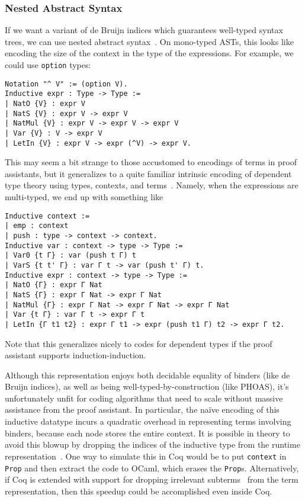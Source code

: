 \subsubsection{Nested Abstract Syntax} \label{sec:binders:nested-abstract-syntax}
If we want a variant of de Bruijn indices which guarantees well-typed syntax trees, we can use nested abstract syntax~\cite{Nested2012Hirschowitz,deBruijn1999Bird}.
On mono-typed ASTs, this looks like encoding the size of the context in the type of the expressions.
For example, we could use \texttt{option} types:~\cite{Nested2012Hirschowitz}
\begin{verbatim}
Notation "^ V" := (option V).
Inductive expr : Type -> Type :=
| NatO {V} : expr V
| NatS {V} : expr V -> expr V
| NatMul {V} : expr V -> expr V -> expr V
| Var {V} : V -> expr V
| LetIn {V} : expr V -> expr (^V) -> expr V.
\end{verbatim}

This may seem a bit strange to those accustomed to encodings of terms in proof assistants, but it generalizes to a quite familiar intrinsic encoding of dependent type theory using types, contexts, and terms~\cite{Strongly2012Benton}.
Namely, when the expressions are multi-typed, we end up with something like
\begin{verbatim}
Inductive context :=
| emp : context
| push : type -> context -> context.
Inductive var : context -> type -> Type :=
| Var0 {t Γ} : var (push t Γ) t
| VarS {t t' Γ} : var Γ t -> var (push t' Γ) t.
Inductive expr : context -> type -> Type :=
| NatO {Γ} : expr Γ Nat
| NatS {Γ} : expr Γ Nat -> expr Γ Nat
| NatMul {Γ} : expr Γ Nat -> expr Γ Nat -> expr Γ Nat
| Var {t Γ} : var Γ t -> expr Γ t
| LetIn {Γ t1 t2} : expr Γ t1 -> expr (push t1 Γ) t2 -> expr Γ t2.
\end{verbatim}

Note that this generalizes nicely to codes for dependent types if the proof assistant supports induction-induction.

Although this representation enjoys both decidable equality of binders (like de Bruijn indices), as well as being well-typed-by-construction (like PHOAS), it's unfortunately unfit for coding algorithms that need to scale without massive assistance from the proof assistant.
In particular, the naïve encoding of this inductive datatype incurs a quadratic overhead in representing terms involving binders, because each node stores the entire context.
It is possible in theory to avoid this blowup by dropping the indices of the inductive type from the runtime representation~\cite{Inductive2003Brady}.
One way to simulate this in Coq would be to put \texttt{context} in \texttt{Prop} and then extract the code to OCaml, which erases the \texttt{Prop}s.
Alternatively, if Coq is extended with support for dropping irrelevant subterms~\cite{sprop} from the term representation, then this speedup could be accomplished even inside Coq.

